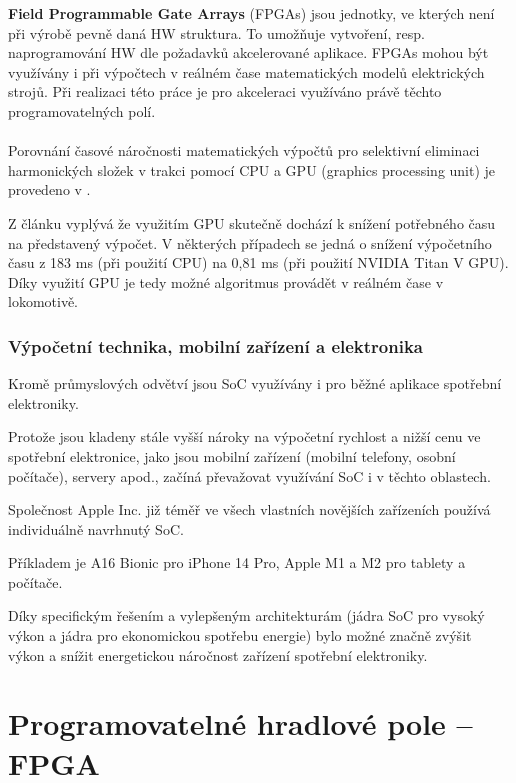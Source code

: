 \documentclass[a4paper, twoside, 11pt]{article}
\begin{document}
		\textbf{Field Programmable Gate Arrays} (FPGAs) jsou jednotky, ve kterých není při výrobě pevně daná HW struktura. To umožňuje vytvoření, resp. naprogramování HW dle požadavků akcelerované aplikace. FPGAs mohou být využívány i při výpočtech v reálném čase matematických modelů elektrických strojů. Při realizaci této práce je pro akceleraci využíváno právě těchto programovatelných polí.\\ \\
		\noindent Porovnání časové náročnosti matematických výpočtů pro selektivní eliminaci harmonických složek v trakci pomocí CPU a GPU (graphics processing unit) je provedeno v \cite{ieee-selective-harmonic-elimination-nvidia}.\par
		Z článku vyplývá že využitím GPU skutečně dochází k snížení potřebného času na představený výpočet. V některých případech se jedná o snížení výpočetního času z 183 ms (při použití CPU) na 0,81 ms (při použití NVIDIA Titan V GPU). Díky využití GPU je tedy možné algoritmus provádět v reálném čase v lokomotivě.

	\subsubsection{Výpočetní technika, mobilní zařízení a elektronika}
	Kromě průmyslových odvětví jsou SoC využívány i pro běžné aplikace spotřební elektroniky.\par
	Protože jsou kladeny stále vyšší nároky na výpočetní rychlost a nižší cenu ve spotřební elektronice, jako jsou mobilní zařízení (mobilní telefony, osobní počítače), servery apod., začíná převažovat využívání SoC i v těchto oblastech.\par
	Společnost Apple Inc. již téměř ve všech vlastních novějších zařízeních používá individuálně navrhnutý SoC.\par
	Příkladem je A16 Bionic pro iPhone 14 Pro, Apple M1 a M2 pro tablety a počítače.\par
	Díky specifickým řešením a vylepšeným architekturám (jádra SoC pro vysoký výkon a jádra pro ekonomickou spotřebu energie) bylo možné značně zvýšit výkon a snížit energetickou náročnost zařízení spotřební elektroniky. \cite{apple-explore-the-new-architecture-of-apple-silicon-macs}


	\section{Programovatelné hradlové pole – FPGA}
\end{document}
